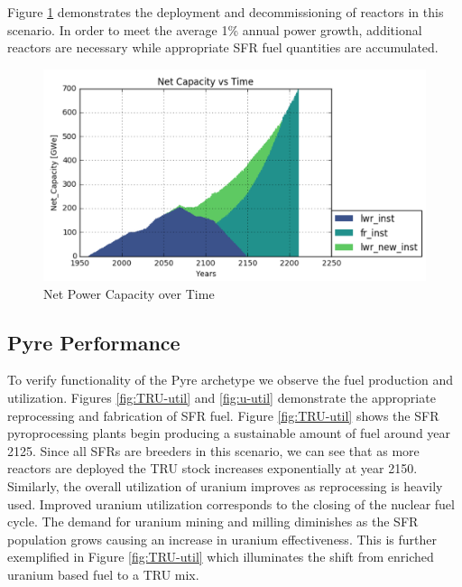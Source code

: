 Figure \ref{fig:net-cap} demonstrates the deployment and decommissioning of reactors in this scenario. In order to meet the average 1\% annual power growth, additional reactors are necessary
while appropriate SFR fuel quantities are accumulated.

\begin{figure} [h]
	\includegraphics[width=\linewidth]{images/transition-netcap}
	\caption{Net Power Capacity over Time}
	\label{fig:net-cap}
\end{figure}

\subsection{Pyre Performance}

To verify functionality of the Pyre archetype we observe the fuel production and utilization.
Figures \ref{fig:TRU-util} and \ref{fig:u-util} demonstrate the appropriate reprocessing and fabrication of SFR fuel. Figure \ref{fig:TRU-util} shows the SFR pyroprocessing
plants begin producing a sustainable amount of fuel around year 2125. Since all SFRs are breeders in this scenario, we can see that as more reactors are deployed the TRU stock increases exponentially at year 2150. Similarly, the overall utilization of uranium improves as reprocessing is heavily used. Improved uranium utilization corresponds to the closing of the nuclear fuel cycle. The demand for uranium mining and milling diminishes as the SFR population grows causing an increase in uranium effectiveness. This is further exemplified in Figure \ref{fig:TRU-util} which illuminates the shift from enriched uranium based fuel to a TRU mix.

